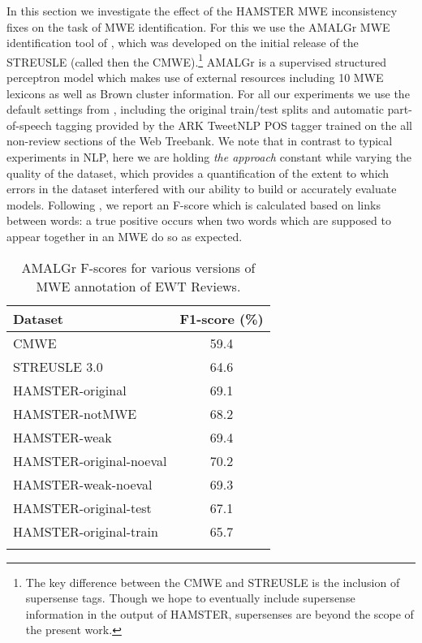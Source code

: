 \documentclass[output=paper,modfonts,nonflat]{langsci/langscibook}
\begin{document}
In this section we investigate the effect of the HAMSTER MWE inconsistency fixes on the task of MWE identification. For this we use the AMALGr MWE identification tool of \citet{Schneider14b}, which was developed on the initial release of the STREUSLE  (called then the CMWE).\footnote{The key difference between the CMWE and STREUSLE is the inclusion of supersense tags. Though we hope to eventually include supersense information in the output of HAMSTER, supersenses are beyond the scope of the present work.} AMALGr is a supervised structured perceptron model which makes use of external resources including 10 MWE lexicons as well as Brown cluster information. For all our experiments we use the default settings from \citet{Schneider14b}, including the original train/test splits and automatic part-of-speech tagging provided by the ARK TweetNLP POS tagger \citep{Owoputi13} trained on the all non-review sections of the  Web Treebank. We note that in contrast to typical experiments in NLP, here we are holding \textit{the approach} constant while varying the quality of the dataset, which provides a quantification of the extent to which errors in the dataset interfered with our ability to build or accurately evaluate models. Following \citet{Schneider14b}, we report an F-score which is calculated based on links between words: a true positive occurs when two words which are supposed to appear together in an MWE do so as expected.


\begin{table*}
\caption{AMALGr F-scores for various versions of MWE annotation of EWT Reviews.} %
\centering
\begin{tabularx}{.7\textwidth}{l c}
\lsptoprule
\textbf{Dataset}&\textbf{F1-score (\%)}\\
\midrule
CMWE \citep{Schneider14b} & 59.4\\
STREUSLE 3.0 & 64.6 \\
\midrule
HAMSTER-original & 69.1 \\ 
HAMSTER-notMWE & 68.2 \\
HAMSTER-weak & 69.4 \\
\midrule
HAMSTER-original-noeval & 70.2 \\
HAMSTER-weak-noeval & 69.3\\
\midrule
HAMSTER-original-test & 67.1\\
HAMSTER-original-train  & 65.7 \\

\lspbottomrule
\end{tabularx}%
\label{tab:exp1} %
\end{table*}
\end{document}
